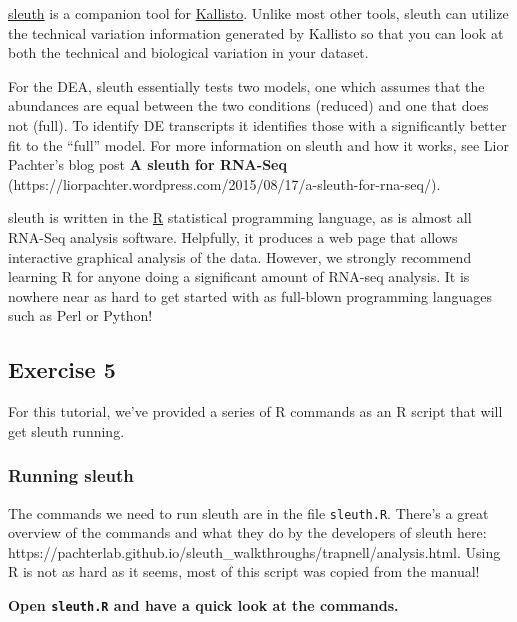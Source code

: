 \documentclass[11pt]{article}
\begin{document}
\href{https://pachterlab.github.io/sleuth}{sleuth} is a companion tool
for \href{https://pachterlab.github.io/kallisto}{Kallisto}. Unlike most
other tools, sleuth can utilize the technical variation information
generated by Kallisto so that you can look at both the technical and
biological variation in your dataset.

For the DEA, sleuth essentially tests two models, one which assumes that
the abundances are equal between the two conditions (reduced) and one
that does not (full). To identify DE transcripts it identifies those
with a significantly better fit to the ``full'' model. For more
information on sleuth and how it works, see Lior Pachter's blog post
\textbf{A sleuth for RNA-Seq}
(https://liorpachter.wordpress.com/2015/08/17/a-sleuth-for-rna-seq/).

sleuth is written in the \href{https://www.r-project.org/}{R}
statistical programming language, as is almost all RNA-Seq analysis
software. Helpfully, it produces a web page that allows interactive
graphical analysis of the data. However, we strongly recommend learning
R for anyone doing a significant amount of RNA-seq analysis. It is
nowhere near as hard to get started with as full-blown programming
languages such as Perl or Python!

\newpage

    \hypertarget{exercise-5}{%
\subsection{Exercise 5}\label{exercise-5}}

    For this tutorial, we've provided a series of R commands as an R script
that will get sleuth running.

    \hypertarget{running-sleuth}{%
\subsubsection{Running sleuth}\label{running-sleuth}}

The commands we need to run sleuth are in the file \texttt{sleuth.R}.
There's a great overview of the commands and what they do by the
developers of sleuth here:
https://pachterlab.github.io/sleuth\_walkthroughs/trapnell/analysis.html.
Using R is not as hard as it seems, most of this script was copied from
the manual!

\textbf{Open \texttt{sleuth.R} and have a quick look at the commands.}
\end{document}

